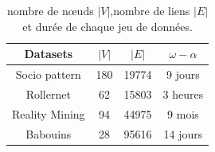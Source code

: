 \begin{table}
\centering

\begin{tabular}{|c|c|c|c|}
\hline  \rule[-1ex]{0pt}{3.5ex}
Datasets & $|V|$ & $|E|$ & $\omega - \alpha$  \\
\hline
Socio pattern & 180 & 19774 & 9 jours \\
Rollernet & 62 & 15803 &  3 heures\\
Reality Mining & 94 & 44975 & 9 mois\\
Babouins & 28 & 95616 & 14 jours\\
\hline
\end{tabular}
\caption{nombre de n\oe uds $|V|$,nombre de liens $|E|$ et durée de chaque jeu de données.}
\label{tab:data_spec_groupe_dense} 
\end{table}

